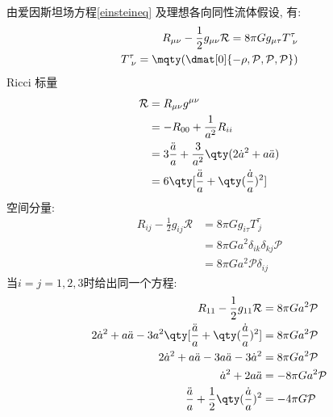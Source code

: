 由爱因斯坦场方程\ref{einsteineq} 及理想各向同性流体假设, 有:
\begin{align*}
    R_{\mu\nu} - \frac{1}{2}g_{\mu\nu}\mathcal{R} = 8\pi G g_{\mu\tau}T^{\tau}_{\ \nu}\\
    T^\tau_{\ \nu} = \mqty(\dmat[0]{-\rho, \mathcal{P}, \mathcal{P}, \mathcal{P}})
\end{align*}
Ricci 标量
\begin{align*}
    \mathcal{R} &= R_{\mu\nu}g^{\mu\nu}\\
    &=-R_{00} + \frac{1}{a^2}R_{ii}\\
    &=3\frac{\ddot{a}}{a} + \frac{3}{a^2}\qty(2\dot{a}^2 + a\ddot{a})\\
    &=6\qty[\frac{\ddot{a}}{a} + \qty(\frac{\dot{a}}{a})^2]
\end{align*}
空间分量:
\begin{align*}
    R_{ij} - \frac{1}{2}g_{ij}\mathcal{R} &= 8\pi G g_{i\tau}T^{\tau}_{\ j}\\
    &= 8\pi G a^2\delta_{ik}\delta_{kj}\mathcal{P}\\
    &= 8\pi G a^2\mathcal{P}\delta_{ij}
\end{align*}
当$i=j=1,2,3$时给出同一个方程:
\begin{align*}
    R_{11} - \frac{1}{2}g_{11}\mathcal{R} &= 8\pi G a^2 \mathcal{P}\\
    2\dot{a}^2 + a\ddot{a} - 3a^2 \qty[\frac{\ddot{a}}{a} + \qty(\frac{\dot{a}}{a})^2] &= 8\pi G a^2 \mathcal{P}\\
    2\dot{a}^2 + a\ddot{a} - 3a\ddot{a} - 3\dot{a}^2 &= 8\pi G a^2 \mathcal{P}\\
    \dot{a}^2 + 2a\ddot{a} &= -8\pi G a^2 \mathcal{P}\\
    \frac{\ddot{a}}{a} + \frac12\qty(\frac{\dot{a}}{a})^2 &= -4\pi G \mathcal{P}
\end{align*}